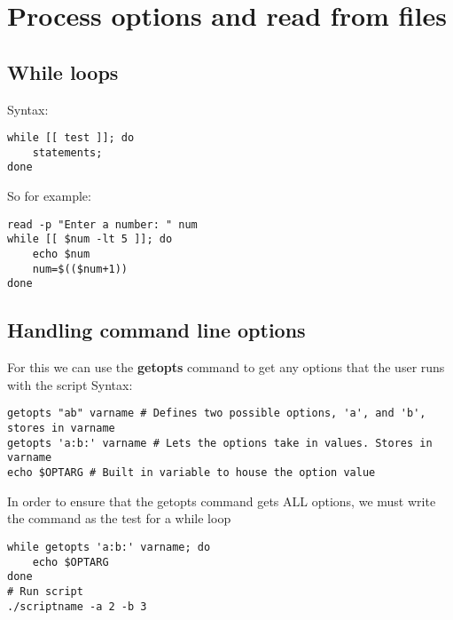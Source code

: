\documentclass{report}
\begin{document}
    \pagebreak \bigbreak \noindent 
    \section{\LARGE Process options and read from files}
    \bigbreak \noindent 
    \subsection{While loops}
    \bigbreak \noindent 
    Syntax:
    \begin{mdframed}[style=purplebox]
    \begin{verbatim}
while [[ test ]]; do
    statements;
done
    \end{verbatim}
    \bigbreak \noindent
    \end{mdframed}
    \bigbreak \noindent 
    So for example:
    \begin{mdframed}[style=purplebox]
    \begin{verbatim}
read -p "Enter a number: " num
while [[ $num -lt 5 ]]; do
    echo $num
    num=$(($num+1))
done
    \end{verbatim}
    \bigbreak \noindent
    \end{mdframed}


    \bigbreak \noindent 
    \subsection{Handling command line options}
    \bigbreak \noindent 
    For this we can use the \textbf{getopts} command to get any options that the user runs with the script
    \bigbreak \noindent 
    Syntax:
    \begin{mdframed}[style=purplebox]
    \begin{verbatim}
getopts "ab" varname # Defines two possible options, 'a', and 'b', stores in varname
getopts 'a:b:' varname # Lets the options take in values. Stores in varname
echo $OPTARG # Built in variable to house the option value
    \end{verbatim}
    \bigbreak \noindent
    \end{mdframed}
    \bigbreak \noindent 
    In order to ensure that the getopts command gets ALL options, we must write the command as the test for a while loop
    \begin{mdframed}[style=purplebox]
    \begin{verbatim}
while getopts 'a:b:' varname; do 
    echo $OPTARG
done
# Run script
./scriptname -a 2 -b 3
    \end{verbatim}
    \bigbreak \noindent
    \end{mdframed}
\end{document}
